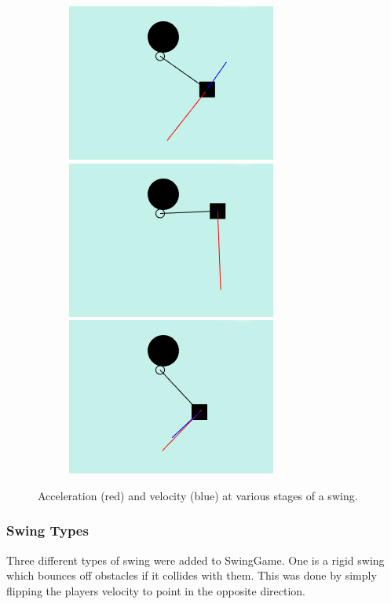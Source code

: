 \documentclass[]{report}
\begin{document}
\begin{figure}[H]
				\begin{subfigure}[b]{1\textwidth}
				\centering
		        \includegraphics[scale=0.4]{swingingMotionRightLowerUp}
		        \includegraphics[scale=0.4]{swingingMotionRightTop}
		        \includegraphics[scale=0.4]{swingingMotionRightLowerDown}
  		        \end{subfigure}
				\caption{Acceleration (red) and velocity (blue) at various stages of a swing.}
				\label{swingingMotion}
			\end{figure}
			
			\subsubsection{Swing Types}
			Three different types of swing were added to SwingGame. One is a rigid swing which bounces off obstacles if it collides with them. This was done by simply flipping the players velocity to point in the opposite direction.
			
\end{document}
